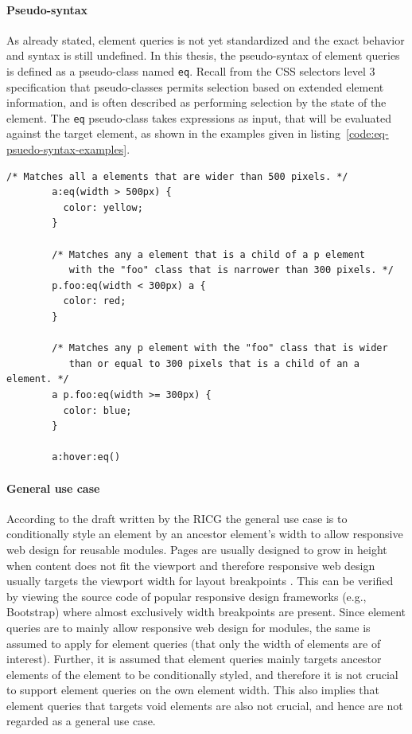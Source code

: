 \documentclass[a4paper,11pt]{kth-mag}
\newcommand{\code}[1]{\texttt{#1}}
\begin{document}
      \paragraph{Pseudo-syntax}
      As already stated, element queries is not yet standardized and the exact behavior and syntax is still undefined.
      In this thesis, the pseudo-syntax of element queries is defined as a pseudo-class named \code{eq}.
      Recall from the \gls{CSS} selectors level 3 specification \cite{w3c_css_selectors} that pseudo-classes permits selection based on extended element information, and is often described as performing selection by the state of the \gls{element}.
      The \code{eq} pseudo-class takes expressions as input, that will be evaluated against the target \gls{element}, as shown in the examples given in listing~\ref{code:eq-psuedo-syntax-examples}.
      \begin{lstlisting}[gobble=8,caption={Examples of the psuedo element queries syntax.}, captionpos=b, label={code:eq-psuedo-syntax-examples}]
        /* Matches all a elements that are wider than 500 pixels. */
        a:eq(width > 500px) {
          color: yellow;
        }

        /* Matches any a element that is a child of a p element 
           with the "foo" class that is narrower than 300 pixels. */
        p.foo:eq(width < 300px) a {
          color: red;
        }

        /* Matches any p element with the "foo" class that is wider 
           than or equal to 300 pixels that is a child of an a element. */
        a p.foo:eq(width >= 300px) {
          color: blue;
        }

        a:hover:eq()
      \end{lstlisting}

      \paragraph{General use case}
      According to the draft written by the \gls{RICG} the general use case is to conditionally style an element by an ancestor \gls{element}'s width \cite{ricg_draft} to allow \gls{responsive} \gls{web} design for reusable modules.
      Pages are usually designed to grow in height when content does not fit the \gls{viewport} and therefore \gls{responsive} \gls{web} design usually targets the \gls{viewport} width for layout breakpoints \cite{book_rwd,wiki_rwd,mjelde2014performance}.
      This can be verified by viewing the source code of popular \gls{responsive} design frameworks (e.g., \gls{Bootstrap}) where almost exclusively width breakpoints are present.
      Since element queries are to mainly allow \gls{responsive} \gls{web} design for modules, the same is assumed to apply for element queries (that only the width of \glspl{element} are of interest).
      Further, it is assumed that element queries mainly targets ancestor \glspl{element} of the element to be conditionally styled, and therefore it is not crucial to support element queries on the own element width.
      This also implies that element queries that targets void \glspl{element} are also not crucial, and hence are not regarded as a general use case.
\end{document}
